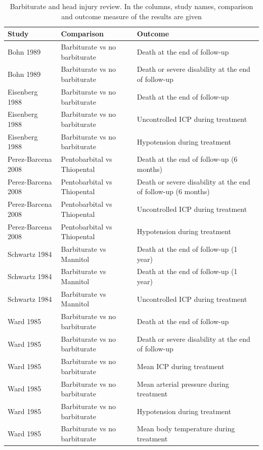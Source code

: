 \documentclass[11pt,a4paper,twoside]{book}\usepackage[]{graphicx}\usepackage[]{color}
\begin{document}
\begin{table}[ht]
\centering
\begingroup\footnotesize
\begin{tabular}{lll}
  \hline
Study & Comparison & Outcome \\ 
  \hline
Bohn 1989 & Barbiturate vs no barbiturate & Death at the end of follow-up \\ 
  Bohn 1989 & Barbiturate vs no barbiturate & Death or severe disability at the end of follow-up \\ 
  Eisenberg 1988 & Barbiturate vs no barbiturate & Death at the end of follow-up \\ 
  Eisenberg 1988 & Barbiturate vs no barbiturate & Uncontrolled ICP during treatment \\ 
  Eisenberg 1988 & Barbiturate vs no barbiturate & Hypotension during treatment \\ 
  Perez-Barcena 2008 & Pentobarbital vs Thiopental & Death at the end of follow-up (6 months) \\ 
  Perez-Barcena 2008 & Pentobarbital vs Thiopental & Death or severe disability at the end of follow-up (6 months) \\ 
  Perez-Barcena 2008 & Pentobarbital vs Thiopental & Uncontrolled ICP during treatment \\ 
  Perez-Barcena 2008 & Pentobarbital vs Thiopental & Hypotension during treatment \\ 
  Schwartz 1984 & Barbiturate vs Mannitol & Death at the end of follow-up (1 year) \\ 
  Schwartz 1984 & Barbiturate vs Mannitol & Death at the end of follow-up (1 year) \\ 
  Schwartz 1984 & Barbiturate vs Mannitol & Uncontrolled ICP during treatment \\ 
  Ward 1985 & Barbiturate vs no barbiturate & Death at the end of follow-up \\ 
  Ward 1985 & Barbiturate vs no barbiturate & Death or severe disability at the end of follow-up \\ 
  Ward 1985 & Barbiturate vs no barbiturate & Mean ICP during treatment \\ 
  Ward 1985 & Barbiturate vs no barbiturate & Mean arterial pressure during treatment \\ 
  Ward 1985 & Barbiturate vs no barbiturate & Hypotension during treatment \\ 
  Ward 1985 & Barbiturate vs no barbiturate & Mean body temperature during treatment \\ 
   \hline
\end{tabular}
\endgroup
\caption{Barbiturate and head injury review. In the columns, study names, comparison and outcome measure of the results are given} 
\label{barbiturates}
\end{table}
\end{document}

